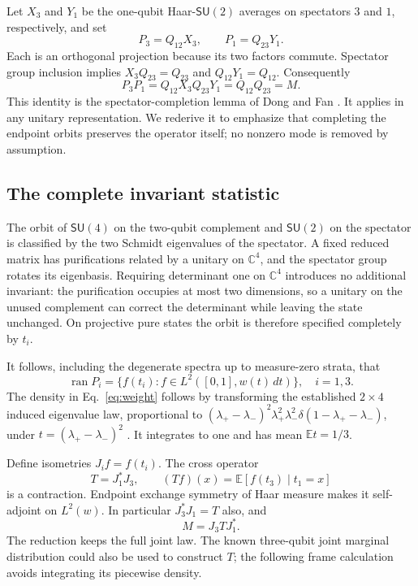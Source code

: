 \documentclass[aps,pra,reprint,amsmath,amssymb,longbibliography]{revtex4-2}
\newcommand{\C}{\mathbb C}
\newcommand{\E}{\mathbb E}
\newcommand{\ran}{\operatorname{ran}}
\newcommand{\SU}{\mathsf{SU}}
\begin{document}
Let $X_3$ and $Y_1$ be the one-qubit Haar-$\SU(2)$ averages on spectators $3$ and $1$, respectively, and set
\begin{equation}
 P_3=Q_{12}X_3,\qquad P_1=Q_{23}Y_1.
\end{equation}
Each is an orthogonal projection because its two factors commute. Spectator group inclusion implies $X_3Q_{23}=Q_{23}$ and $Q_{12}Y_1=Q_{12}$. Consequently
\begin{equation}
 P_3P_1=Q_{12}X_3Q_{23}Y_1=Q_{12}Q_{23}=M.
\label{eq:completion}
\end{equation}
This identity is the spectator-completion lemma of Dong and Fan \cite{Dong2026}. It applies in any unitary representation. We rederive it to emphasize that completing the endpoint orbits preserves the operator itself; no nonzero mode is removed by assumption.

\subsection{The complete invariant statistic}

The orbit of $\SU(4)$ on the two-qubit complement and $\SU(2)$ on the spectator is classified by the two Schmidt eigenvalues of the spectator. A fixed reduced matrix has purifications related by a unitary on $\C^4$, and the spectator group rotates its eigenbasis. Requiring determinant one on $\C^4$ introduces no additional invariant: the purification occupies at most two dimensions, so a unitary on the unused complement can correct the determinant while leaving the state unchanged. On projective pure states the orbit is therefore specified completely by $t_i$.

It follows, including the degenerate spectra up to measure-zero strata, that
\begin{equation}
 \ran P_i=\{f(t_i):f\in L^2([0,1],w(t)\,dt)\},\quad i=1,3.
\label{eq:range}
\end{equation}
The density in Eq.~\eqref{eq:weight} follows by transforming the established $2\times4$ induced eigenvalue law, proportional to
$(\lambda_+-\lambda_-)^2\lambda_+^2\lambda_-^2\delta(1-\lambda_+-\lambda_-)$, under $t=(\lambda_+-\lambda_-)^2$ \cite{Zyczkowski2001,Enriquez2018}. It integrates to one and has mean $\E t=1/3$.

Define isometries $J_i f=f(t_i)$. The cross operator
\begin{equation}
 T=J_1^*J_3,\qquad (Tf)(x)=\E[f(t_3)\mid t_1=x]
\label{eq:T}
\end{equation}
is a contraction. Endpoint exchange symmetry of Haar measure makes it self-adjoint on $L^2(w)$. In particular $J_3^*J_1=T$ also, and
\begin{equation}
 M=J_3TJ_1^*.
\label{eq:factor}
\end{equation}
The reduction keeps the full joint law. The known three-qubit joint marginal distribution \cite{Christandl2014} could also be used to construct $T$; the following frame calculation avoids integrating its piecewise density.
\end{document}
